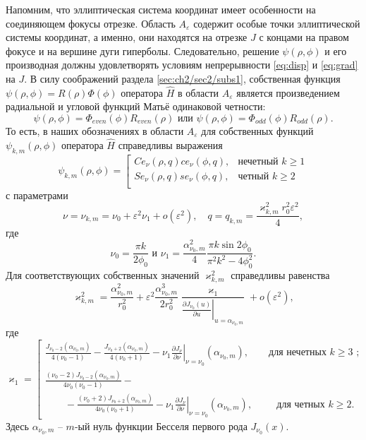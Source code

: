 Напомним, что эллиптическая система координат имеет особенности на соединяющем фокусы отрезке. Область $A_\varepsilon$ содержит особые точки эллиптической системы координат, а именно, они находятся на отрезке $J$ с концами на правом фокусе и на вершине дуги гиперболы.
Следовательно, решение $\psi(\rho, \phi)$ и его производная должны удовлетворять условиям непрерывности \eqref{eq:disp} и \eqref{eq:grad} на  $J$.
В силу соображений раздела \ref{sec:ch2/sec2/subs1}, собственная функция  $\psi(\rho,\phi)=R(\rho) \Phi(\phi)$ оператора $\hat{H}$ в области $A_\varepsilon$ является произведением радиальной и угловой функций Матьё одинаковой четности:
$$ \psi(\rho,\phi) = \Phi_{even}(\phi) R_{even}(\rho)  
\text{ или }
 \psi(\rho,\phi) = \Phi_{odd}(\phi) R_{odd}(\rho) .  $$
То есть, в наших обозначениях в области $A_\varepsilon$ для собственных функций $\psi_{k, m}(\rho, \phi)$ оператора   $\hat{H}$ справедливы выражения
\begin{equation}
\psi_{k, m}(\rho, \phi) = 
\left[
\begin{array}{ll}
    Ce_\nu(\rho, q) ce_\nu(\phi, q) ,   &    \text{нечетный $k \geq 1$}\\
    Se_\nu(\rho, q) se_\nu(\phi, q) ,   &    \text{четный $k \geq 2$}\\
\end{array}
\right.\label{eq:fun}
\end{equation}
с параметрами
\[
\nu = \nu_{k,m} = \nu_0+ \varepsilon^2 \nu_1 + o(\varepsilon^2),  \quad q=q_{k,m} = \dfrac{\varkappa_{k,m}^2 r_0^2 \varepsilon^2}{4},
\]
где
$$\nu_0 = \frac{\pi k}{2\phi_0}\text{\ \  и\  \  }\nu_1=\frac{\alpha_{\nu_0, m}^2}{4} \frac{\pi k \sin 2\phi_0}{\pi^2 k^2 - 4\phi_0^2}  .$$
Для соответствующих собственных  значений  $\varkappa^2_{k, m}$ справедливы равенства
\begin{equation}
\varkappa^2_{k, m} = \dfrac{\alpha_{\nu_0, m}^2}{r_0^2} +
\varepsilon^2 \dfrac{\alpha_{\nu_0, m}^3}{2 r_0^2}\dfrac{\varkappa_1 }{ \left.\frac{\partial J_{\nu_0}(u)}{\partial u}\right|_{u=\alpha_{\nu_0, m}} } + o(\varepsilon^2),\label{eq:val}
\end{equation}
где
\begin{equation*}
    \varkappa_1 = 
    \left[
\begin{array}{ll}
\frac{J_{\nu_0-2}(\alpha_{\nu_0, m})}{4(\nu_0-1)} - \frac{J_{\nu_0+2}(\alpha_{\nu_0, m})}{4(\nu_0+1)} 
  - \nu_1 \left.\frac{\partial J_\nu}{\partial \nu}\right|_{\nu=\nu_0}(\alpha_{\nu_0, m}),\qquad \text{для нечетных $k\geq 3$ ;} \\[10pt]
\frac{(\nu_0 - 2)J_{\nu_0-2}(\alpha_{\nu_0, m})   }{4\nu_0 (\nu_0-1)} -\\
\qquad - \frac{(\nu_0 + 2)J_{\nu_0+2}(\alpha_{\nu_0, m})}{4\nu_0 (\nu_0+1)}  
- \nu_1 \left.\frac{\partial J_\nu}{\partial \nu}\right|_{\nu = \nu_0}(\alpha_{\nu_0, m}), \qquad \ \ \!    \text{для четных $k \geq 2$}.        
\end{array}
\right.
\end{equation*}
Здесь $\alpha_{\nu_0,m}$ --  $m$-ый нуль функции Бесселя первого рода $J_{\nu_0}(x)$.


